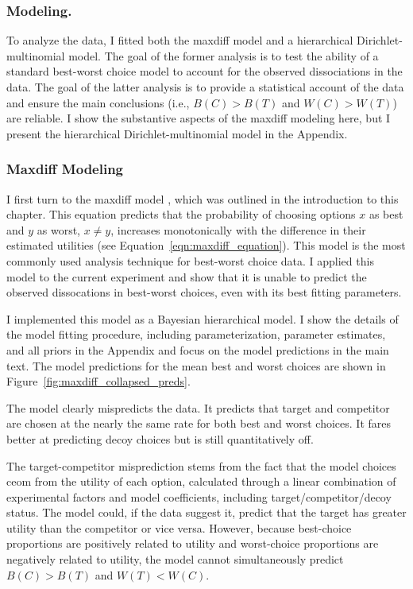 \subsubsection{Modeling.}

To analyze the data, I fitted both the maxdiff model and a hierarchical Dirichlet-multinomial model. The goal of the former analysis is to test the ability of a standard best-worst choice model to account for the observed dissociations in the data. The goal of the latter analysis is to provide a statistical account of the data and ensure the main conclusions (i.e., $B(C)>B(T)$ and $W(C)>W(T)$) are reliable. I show the substantive aspects of the maxdiff modeling here, but I present the hierarchical Dirichlet-multinomial model in the Appendix.

\subsubsection{Maxdiff Modeling}

I first turn to the maxdiff model \parencite{marleyProbabilisticModelsBest2005}, which was outlined in the introduction to this chapter. This equation predicts that the probability of choosing options $x$ as best and $y$ as worst, $x \neq y$, increases monotonically with the difference in their estimated utilities (see Equation~\ref{eqn:maxdiff_equation}). This model is the most commonly used analysis technique for best-worst choice data. I applied this model to the current experiment and show that it is unable to predict the observed dissocations in best-worst choices, even with its best fitting parameters.

I implemented this model as a Bayesian hierarchical model. I show the details of the model fitting procedure, including parameterization, parameter estimates, and all priors in the Appendix and focus on the model predictions in the main text. The model predictions for the mean best and worst choices are shown in Figure~\ref{fig:maxdiff_collapsed_preds}.

The model clearly mispredicts the data. It predicts that target and competitor are chosen at the nearly the same rate for both best and worst choices. It fares better at predicting decoy choices but is still quantitatively off.

The target-competitor misprediction stems from the fact that the model choices ceom from the utility of each option, calculated through a linear combination of experimental factors and model coefficients, including target/competitor/decoy status. The model could, if the data suggest it, predict that the target has greater utility than the competitor or vice versa. However, because best-choice proportions are positively related to utility and worst-choice proportions are negatively related to utility, the model cannot simultaneously predict $B(C)>B(T)$ and $W(T)<W(C)$. 

